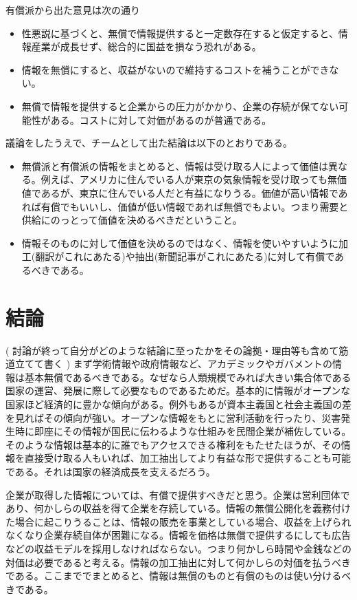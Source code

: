 \documentclass[12pt,a4j]{jarticle}
\begin{document}
有償派から出た意見は次の通り

\begin{itemize}
\item 性悪説に基づくと、無償で情報提供すると一定数存在すると仮定すると、情報産業が成長せず、総合的に国益を損なう恐れがある。
\item 情報を無償にすると、収益がないので維持するコストを補うことができない。
\item 無償で情報を提供すると企業からの圧力がかかり、企業の存続が保てない可能性がある。コストに対して対価があるのが普通である。
\end{itemize}

議論をしたうえで、チームとして出た結論は以下のとおりである。

\begin{itemize}
\item 無償派と有償派の情報をまとめると、情報は受け取る人によって価値は異なる。例えば、アメリカに住んでいる人が東京の気象情報を受け取っても無価値であるが、東京に住んでいる人だと有益になりうる。価値が高い情報であれば有償でもいいし、価値が低い情報であれば無償でもよい。つまり需要と供給にのっとって価値を決めるべきだということ。
\item 情報そのものに対して価値を決めるのではなく、情報を使いやすいように加工(翻訳がこれにあたる)や抽出(新聞記事がこれにあたる)に対して有償であるべきである。
\end{itemize}

\section{結論}
( 討論が終って自分がどのような結論に至ったかをその論拠・理由等も含めて筋道立てて書く )
まず学術情報や政府情報など、アカデミックやガバメントの情報は基本無償であるべきである。なぜなら人類規模でみれば大きい集合体である国家の運営、発展に際して必要なものであるためだ。基本的に情報がオープンな国家ほど経済的に豊かな傾向がある。例外もあるが資本主義国と社会主義国の差を見ればその傾向が強い。オープンな情報をもとに営利活動を行ったり、災害発生時に即座にその情報が国民に伝わるような仕組みを民間企業が補佐している。そのような情報は基本的に誰でもアクセスできる権利をもたせたほうが、その情報を直接受け取る人もいれば、加工抽出してより有益な形で提供することも可能である。それは国家の経済成長を支えるだろう。

企業が取得した情報については、有償で提供すべきだと思う。企業は営利団体であり、何かしらの収益を得て企業を存続している。情報の無償公開化を義務付けた場合に起こりうることは、情報の販売を事業としている場合、収益を上げられなくなり企業存続自体が困難になる。情報を価格は無償で提供するにしても広告などの収益モデルを採用しなければならない。つまり何かしら時間や金銭などの対価は必要であると考える。情報の加工抽出に対して何かしらの対価を払うべきである。ここまででまとめると、情報は無償のものと有償のものは使い分けるべきである。
\end{document}
